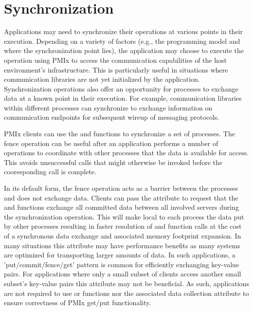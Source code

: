 \chapter{Synchronization}
\label{chap:api_sync}

Applications may need to synchronize their operations at various points in
their execution. Depending on a variety of factors (e.g., the programming
model and where the synchronization point lies), the application may choose to
execute the operation using \ac{PMIx} to access the communication capabilities
of the host environment's infrastructure. This is particularly useful in
situations where communication libraries are not yet initialized by the application.
Synchronization operations also offer an opportunity for processes to exchange
data at a known point in their execution.  For example, communication libraries within
different processes can synchronize to exchange information on communication endpoints
for subsequent wireup of messaging protocols.

\ac{PMIx} clients can use the  and  functions 
to synchronize a set of processes.  The fence operation can be useful after an application
performs a number of  operations to coordinate with other processes that the
data is available for access.   This avoids unsuccessful  calls that might
otherwise be invoked before the cooresponding  call is complete.

In its default form, the fence operation acts as a barrier between the processes and does not exchange data.
Clients can pass the  attribute to request 
that the  and  functions exchange all committed 
data between all involved servers during the synchronization operation.
This will make local to each process the data put by other processes resulting 
in faster resolution of  and  function calls at 
the cost of a synchronous data exchange and associated memory footprint expansion.
In many situations 
this attribute may have performance benefits as many systems are optimized for transporting 
larger amounts of data.  In such applications, a 'put/commit/fence/get' 
pattern is common for efficiently exchanging key-value pairs.  
For applications where only a small subset of clients access another small subset's key-value pairs 
this attribute may not be beneficial.  As such, applications are not required to use
 or  functions nor the associated data collection
attribute to ensure correctness of \ac{PMIx} get/put functionality.

